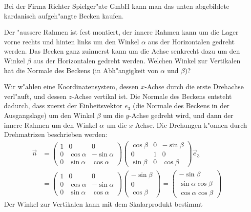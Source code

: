 Bei der Firma Richter Spielger"ate GmbH kann man das unten abgebildete
kardanisch aufgeh"angte Becken kaufen. 
\begin{center}
\end{center}
Der "aussere Rahmen ist fest montiert, der innere Rahmen kann um
die Lager vorne rechts und hinten links um den Winkel $\alpha$
aus der Horizontalen
gedreht werden. Das Becken ganz zuinnerst kann um die Achse
senkrecht dazu um den Winkel $\beta$ aus der Horizontalen gedreht werden.
Welchen
Winkel zur Vertikalen hat die Normale des Beckens (in Abh"angigkeit
von $\alpha$ und $\beta$)?

\begin{loesung}
Wir w"ahlen eine Koordinatensystem, dessen $x$-Achse durch die
erste Drehachse verl"auft, und dessen $z$-Achse vertikal ist.
Die Normale des Beckens entsteht dadurch, dass zuerst der
Einheitsvektor $e_3$ (die Normale des Beckens in der Ausgangslage)
um den Winkel $\beta$ um die $y$-Achse gedreht wird,
und dann der innere Rahmen um den Winkel $\alpha$ um die
$x$-Achse. Die Drehungen k"onnen durch Drehmatrizen beschrieben werden:
\begin{align*}
\vec n
&=
\begin{pmatrix}
1&0&0\\
0&\cos\alpha&-\sin\alpha\\
0&\sin\alpha& \cos\alpha
\end{pmatrix}
\begin{pmatrix}
\cos\beta&0&-\sin\beta\\
0&1&0\\
\sin\beta&0&\cos\beta
\end{pmatrix}\vec e_3
\\
&=
\begin{pmatrix}
1&0&0\\
0&\cos\alpha&-\sin\alpha\\
0&\sin\alpha& \cos\alpha
\end{pmatrix}
\begin{pmatrix}
-\sin\beta\\
0\\
\cos\beta
\end{pmatrix}
=
\begin{pmatrix}
-\sin\beta\\
\sin\alpha\cos\beta\\
\cos\alpha\cos\beta
\end{pmatrix}
\end{align*}
Der Winkel zur Vertikalen kann mit dem Skalarprodukt bestimmt

\end{loesung}
